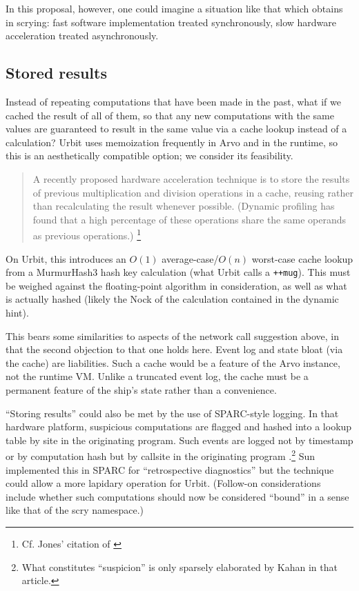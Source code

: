 \documentclass[twoside]{article}
\begin{document}
In this proposal, however, one could imagine a situation like that which obtains in scrying:  fast software implementation treated synchronously, slow hardware acceleration treated asynchronously.

\subsection{Stored results}
\label{stored-results}

Instead of repeating computations that have been made in the past, what if we cached the result of all of them, so that any new computations with the same values are guaranteed to result in the same value via a cache lookup instead of a calculation?  Urbit uses memoization frequently in Arvo and in the runtime, so this is an aesthetically compatible option; we consider its feasibility.

\begin{quote}
A recently proposed hardware acceleration technique is to store the results of previous multiplication and division operations in a cache, reusing rather than recalculating the result whenever possible. (Dynamic profiling has found that a high percentage of these operations share the same operands as previous operations.)  \citep[p.~1148]{Jones2008}\footnote{Cf. Jones' citation of \citeauthor{Citron1998}} %
\end{quote}

On Urbit, this introduces an $O(1)$ average-case/$O(n)$ worst-case cache lookup from a MurmurHash3 hash key calculation (what Urbit calls a \lstinline[style=inlinecode]{++mug}).  This must be weighed against the floating-point algorithm in consideration, as well as what is actually hashed (likely the Nock of the calculation contained in the dynamic hint).

This bears some similarities to aspects of the network call suggestion above, in that the second objection to that one holds here.  Event log and state bloat (via the cache) are liabilities.  Such a cache would be a feature of the Arvo instance, not the runtime VM.  Unlike a truncated event log, the cache must be a permanent feature of the ship's state rather than a convenience.

“Storing results” could also be met by the use of SPARC-style logging.  In that hardware platform, suspicious computations are flagged and hashed into a lookup table by site in the originating program.  Such events are logged not by timestamp or by computation hash but by callsite in the originating program \citep[p.~6]{Kahan1997}.\footnote{What constitutes “suspicion” is only sparsely elaborated by Kahan in that article.}  Sun implemented this in SPARC for “retrospective diagnostics” but the technique could allow a more lapidary operation for Urbit.  (Follow-on considerations include whether such computations should now be considered “bound” in a sense like that of the scry namespace.)
\end{document}
